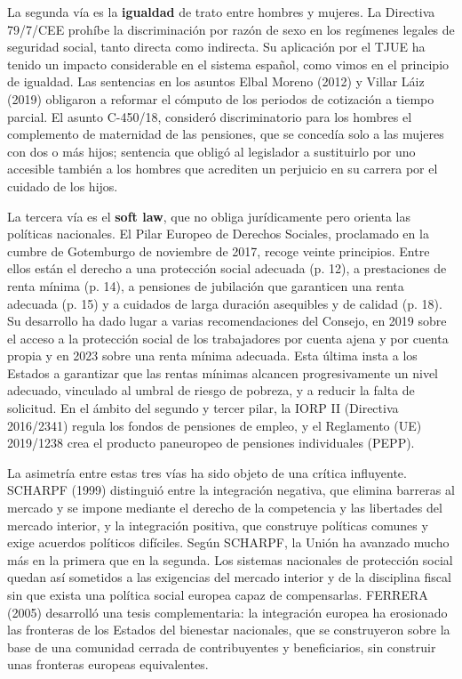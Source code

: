 \documentclass[10pt,a4paper]{article}
\begin{document}
La segunda vía es la \textbf{igualdad} de trato entre hombres y mujeres. La Directiva 79/7/CEE prohíbe la discriminación por razón de sexo en los regímenes legales de seguridad social, tanto directa como indirecta. Su aplicación por el TJUE ha tenido un impacto considerable en el sistema español, como vimos en el principio de igualdad. Las sentencias en los asuntos Elbal Moreno (2012) y Villar Láiz (2019) obligaron a reformar el cómputo de los periodos de cotización a tiempo parcial. El asunto C-450/18, consideró discriminatorio para los hombres el complemento de maternidad de las pensiones, que se concedía solo a las mujeres con dos o más hijos; sentencia que obligó al legislador a sustituirlo por uno accesible también a los hombres que acrediten un perjuicio en su carrera por el cuidado de los hijos. 

La tercera vía es el \textbf{soft law}, que no obliga jurídicamente pero orienta las políticas nacionales. El Pilar Europeo de Derechos Sociales, proclamado en la cumbre de Gotemburgo de noviembre de 2017, recoge veinte principios. Entre ellos están el derecho a una protección social adecuada (p. 12), a prestaciones de renta mínima (p. 14), a pensiones de jubilación que garanticen una renta adecuada (p. 15) y a cuidados de larga duración asequibles y de calidad (p. 18). Su desarrollo ha dado lugar a varias recomendaciones del Consejo, en 2019 sobre el acceso a la protección social de los trabajadores por cuenta ajena y por cuenta propia y en 2023 sobre una renta mínima adecuada. Esta última insta a los Estados a garantizar que las rentas mínimas alcancen progresivamente un nivel adecuado, vinculado al umbral de riesgo de pobreza, y a reducir la falta de solicitud. En el ámbito del segundo y tercer pilar, la IORP II (Directiva 2016/2341) regula los fondos de pensiones de empleo, y el Reglamento (UE) 2019/1238 crea el producto paneuropeo de pensiones individuales (PEPP).

La asimetría entre estas tres vías ha sido objeto de una crítica influyente. SCHARPF (1999) distinguió entre la integración negativa, que elimina barreras al mercado y se impone mediante el derecho de la competencia y las libertades del mercado interior, y la integración positiva, que construye políticas comunes y exige acuerdos políticos difíciles. Según SCHARPF, la Unión ha avanzado mucho más en la primera que en la segunda. Los sistemas nacionales de protección social quedan así sometidos a las exigencias del mercado interior y de la disciplina fiscal sin que exista una política social europea capaz de compensarlas. FERRERA (2005) desarrolló una tesis complementaria: la integración europea ha erosionado las fronteras de los Estados del bienestar nacionales, que se construyeron sobre la base de una comunidad cerrada de contribuyentes y beneficiarios, sin construir unas fronteras europeas equivalentes.
\end{document}
